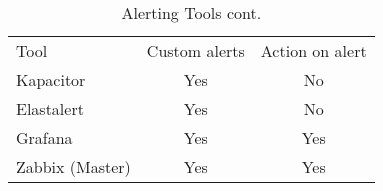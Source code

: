 \begin{table}[]
	\centering
	\caption{Alerting Tools cont.}
	\label{my-label}
	\begin{tabular}{lcc}
		Tool & Custom alerts & Action on alert \\
		Kapacitor                    & Yes           & No              \\
		Elastalert                   & Yes           & No              \\
		Grafana                      & Yes           & Yes             \\
		Zabbix (Master)              & Yes           & Yes            
	\end{tabular}
\end{table}